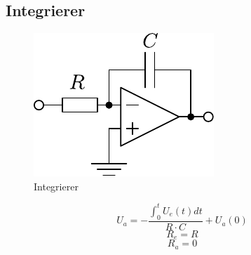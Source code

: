 



\subsection{Integrierer}
\begin{figure}[h!]
	\centering
	\includegraphics[scale=\schscale]{../fig/op_int.pdf}
	\caption{Integrierer}
	\label{sch:op-int}
\end{figure}
\[ U_a = - \frac{\int_{0}^{t} U_e(t) dt}{R \cdot C} + U_a(0) \]
\[ R_e = R \]
\[ R_a = 0 \]